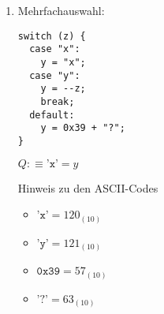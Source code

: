 \documentclass{bschlangaul-aufgabe}
\begin{document}
\begin{enumerate}
\begin{bAntwort}
\end{bAntwort}

%

\item Mehrfachauswahl:

\begin{verbatim}
switch (z) {
  case "x":
    y = "x";
  case "y":
    y = --z;
    break;
  default:
    y = 0x39 + "?";
}
\end{verbatim}

$Q :\equiv \texttt{'x'} = y$

Hinweis zu den ASCII-Codes

\begin{itemize}
\item $\texttt{'x'} = 120_{(10)}$
\item $\texttt{'y'} = 121_{(10)}$
\item $\texttt{0x39} = 57_{(10)}$
\item $\texttt{'?'} = 63_{(10)}$
\end{itemize}

\end{enumerate}
\end{document}
